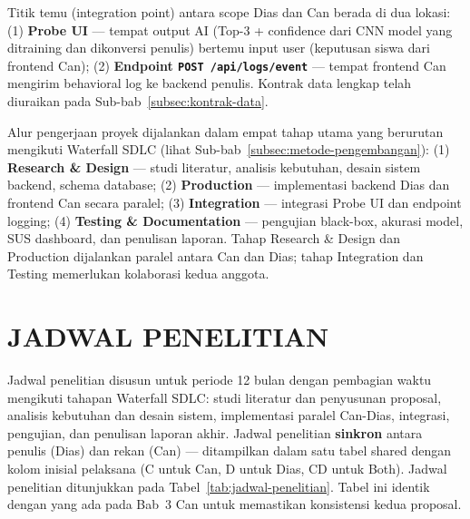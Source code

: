 \documentclass[12pt,a4paper,oneside,openany]{report}
\begin{document}
Titik temu (integration point) antara scope Dias dan Can berada di dua lokasi: (1) \textbf{Probe UI} --- tempat output AI (Top-3 + confidence dari CNN model yang ditraining dan dikonversi penulis) bertemu input user (keputusan siswa dari frontend Can); (2) \textbf{Endpoint \texttt{POST /api/logs/event}} --- tempat frontend Can mengirim behavioral log ke backend penulis. Kontrak data lengkap telah diuraikan pada Sub-bab~\ref{subsec:kontrak-data}.

Alur pengerjaan proyek dijalankan dalam empat tahap utama yang berurutan mengikuti Waterfall SDLC (lihat Sub-bab~\ref{subsec:metode-pengembangan}): (1) \textbf{Research \& Design} --- studi literatur, analisis kebutuhan, desain sistem backend, schema database; (2) \textbf{Production} --- implementasi backend Dias dan frontend Can secara paralel; (3) \textbf{Integration} --- integrasi Probe UI dan endpoint logging; (4) \textbf{Testing \& Documentation} --- pengujian black-box, akurasi model, SUS dashboard, dan penulisan laporan. Tahap Research \& Design dan Production dijalankan paralel antara Can dan Dias; tahap Integration dan Testing memerlukan kolaborasi kedua anggota.

\section{JADWAL PENELITIAN}
\label{sec:jadwal-penelitian}

Jadwal penelitian disusun untuk periode 12 bulan dengan pembagian waktu mengikuti tahapan Waterfall SDLC: studi literatur dan penyusunan proposal, analisis kebutuhan dan desain sistem, implementasi paralel Can-Dias, integrasi, pengujian, dan penulisan laporan akhir. Jadwal penelitian \textbf{sinkron} antara penulis (Dias) dan rekan (Can) --- ditampilkan dalam satu tabel shared dengan kolom inisial pelaksana (C untuk Can, D untuk Dias, CD untuk Both). Jadwal penelitian ditunjukkan pada Tabel~\ref{tab:jadwal-penelitian}. Tabel ini identik dengan yang ada pada Bab~3 Can untuk memastikan konsistensi kedua proposal.
\end{document}
